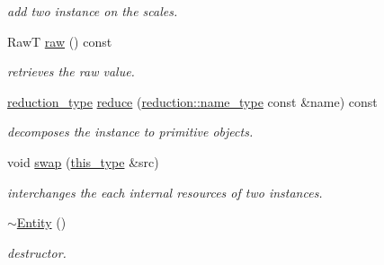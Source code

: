 \begin{DoxyCompactItemize}
\begin{DoxyCompactList}\small\item\em add two instance on the scales. \end{DoxyCompactList}\item 
\hypertarget{classhryky_1_1scale_1_1_entity_ac9d555edcbc0d8f8369f386a7b4d4d0f}{Raw\-T \hyperlink{classhryky_1_1scale_1_1_entity_ac9d555edcbc0d8f8369f386a7b4d4d0f}{raw} () const }\label{classhryky_1_1scale_1_1_entity_ac9d555edcbc0d8f8369f386a7b4d4d0f}

\begin{DoxyCompactList}\small\item\em retrieves the raw value. \end{DoxyCompactList}\item 
\hypertarget{classhryky_1_1scale_1_1_entity_aa745d5ef4401aa7f06ba72b91d06a3df}{\hyperlink{namespacehryky_a343a9a4c36a586be5c2693156200eadc}{reduction\-\_\-type} \hyperlink{classhryky_1_1scale_1_1_entity_aa745d5ef4401aa7f06ba72b91d06a3df}{reduce} (\hyperlink{namespacehryky_1_1reduction_ac686c30a4c8d196bbd0f05629a6b921f}{reduction\-::name\-\_\-type} const \&name) const }\label{classhryky_1_1scale_1_1_entity_aa745d5ef4401aa7f06ba72b91d06a3df}

\begin{DoxyCompactList}\small\item\em decomposes the instance to primitive objects. \end{DoxyCompactList}\item 
\hypertarget{classhryky_1_1scale_1_1_entity_a8ec8cc49ba0fd7e19cfe2ed714d62663}{void \hyperlink{classhryky_1_1scale_1_1_entity_a8ec8cc49ba0fd7e19cfe2ed714d62663}{swap} (\hyperlink{classhryky_1_1scale_1_1_entity_af312f46dc3d31369144a960d386790c3}{this\-\_\-type} \&src)}\label{classhryky_1_1scale_1_1_entity_a8ec8cc49ba0fd7e19cfe2ed714d62663}

\begin{DoxyCompactList}\small\item\em interchanges the each internal resources of two instances. \end{DoxyCompactList}\item 
\hypertarget{classhryky_1_1scale_1_1_entity_a80ab2b2ee794a72d1a56b1e918ed9d9f}{\hyperlink{classhryky_1_1scale_1_1_entity_a80ab2b2ee794a72d1a56b1e918ed9d9f}{$\sim$\-Entity} ()}\label{classhryky_1_1scale_1_1_entity_a80ab2b2ee794a72d1a56b1e918ed9d9f}

\begin{DoxyCompactList}\small\item\em destructor. \end{DoxyCompactList}\end{DoxyCompactItemize}
